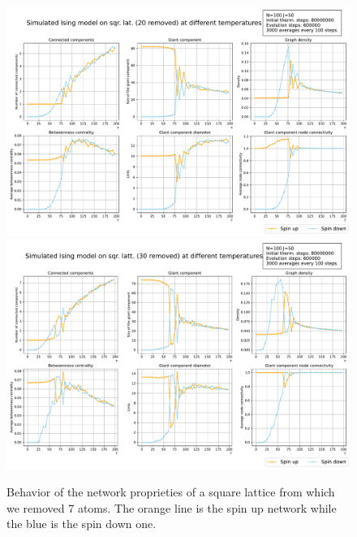 \begin{figure}[!htb]
  \includegraphics[width=.5\linewidth]{Broken/Square_20.pdf}
  \includegraphics[width=.5\linewidth]{Broken/Square_30.pdf}
    \caption{Behavior of the network proprieties of a square lattice from which we removed 7 atoms. The orange line is the spin up network while the blue is the spin down one.}
    \label{Fig:BSNetworkmeasure}
\end{figure}

